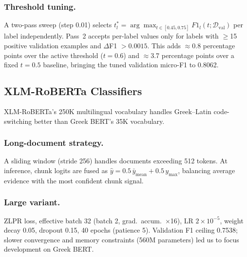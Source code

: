 \subsubsection{Threshold tuning.}
A two-pass sweep (step 0.01) selects $t_l^{*} = \arg\max_{t \in [0.45,0.75]} F1_l(t;\mathcal{D}_{\text{val}})$ per label independently. Pass~2 accepts per-label values only for labels with $\geq$15 positive validation examples and $\Delta$F1 $>0.0015$. This adds $\approx$0.8 percentage points over the active threshold ($t{=}0.6$) and $\approx$3.7 percentage points over a fixed $t{=}0.5$ baseline, bringing the tuned validation micro-F1 to 0.8062.

\subsection{XLM-RoBERTa Classifiers}
\label{subsec:xlmr}

XLM-RoBERTa's 250K multilingual vocabulary handles Greek--Latin code-switching better
than Greek BERT's 35K vocabulary.

\subsubsection{Long-document strategy.}
A sliding window (stride 256) handles documents exceeding 512 tokens. At inference, chunk logits are fused as $\hat{y} = 0.5\,\bar{y}_{\text{mean}} + 0.5\,y_{\text{max}}$, balancing average evidence with the most confident chunk signal.

\subsubsection{Large variant.}
ZLPR loss, effective batch 32 (batch 2, grad.\ accum.\ $\times$16), LR $2\times10^{-5}$,
weight decay 0.05, dropout 0.15, 40 epochs (patience 5). Validation F1 ceiling
0.7538; slower convergence and memory constraints (560M parameters) led us to
focus development on Greek BERT.

